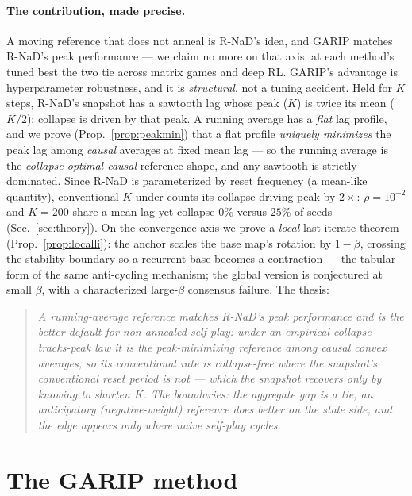 \documentclass[10pt,twocolumn]{article}
\theoremstyle{plain}
\theoremstyle{remark}
\begin{document}
\paragraph{The contribution, made precise.} A moving reference that does not
anneal is R-NaD's idea, and GARIP matches R-NaD's peak performance --- we claim no
more on that axis: at each method's tuned best the two tie across matrix games and
deep RL. GARIP's advantage is hyperparameter robustness, and it is \emph{structural},
not a tuning accident. Held for $K$ steps, R-NaD's snapshot has a sawtooth lag
whose peak ($K$) is twice its mean ($K/2$); collapse is driven by that peak. A
running average has a \emph{flat} lag profile, and we prove (Prop.~\ref{prop:peakmin})
that a flat profile \emph{uniquely minimizes} the peak lag among \emph{causal}
averages at fixed mean lag --- so the running average is the \emph{collapse-optimal
causal} reference shape, and any sawtooth is strictly dominated. Since R-NaD is
parameterized by reset frequency (a mean-like quantity), conventional $K$
under-counts its collapse-driving peak by $2\times$: $\rho\!=\!10^{-2}$ and
$K\!=\!200$ share a mean lag yet collapse $0\%$ versus $25\%$ of seeds
(Sec.~\ref{sec:theory}). On the convergence axis we prove a \emph{local} last-iterate
theorem (Prop.~\ref{prop:localli}): the anchor scales the base map's rotation by
$1-\beta$, crossing the stability boundary so a recurrent base becomes a contraction
--- the tabular form of the same anti-cycling mechanism; the global version is
conjectured at small $\beta$, with a characterized large-$\beta$ consensus failure. The
thesis:
\begin{quote}\itshape
A running-average reference matches R-NaD's peak performance and is the better
\emph{default} for non-annealed self-play: under an empirical collapse-tracks-peak
law it is the peak-minimizing reference \emph{among causal convex averages}, so its
conventional rate is collapse-free where the snapshot's conventional reset period is
not --- which the snapshot recovers only by knowing to shorten $K$. The boundaries:
the aggregate gap is a tie, an anticipatory (negative-weight) reference does better
on the stale side, and the edge appears only where naive self-play cycles.
\end{quote}

\section{The GARIP method}
\label{sec:method}
\end{document}
